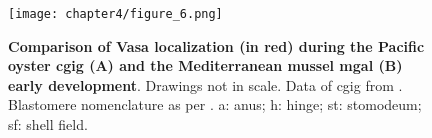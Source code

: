\begin{figure}
    \centering
    \captionsetup[subfigure]{labelformat=nocaption}
	\begin{subfigure}{0\linewidth}
	\caption{}\label{fig:vasaComparison-A}
	\end{subfigure}%
	\begin{subfigure}{0\linewidth}
    \caption{}\label{fig:vasaComparison-B}
    \end{subfigure}%
	\texttt{[image: chapter4/figure\_6.png]}
	\caption[\textbf{Comparison of Vasa localization (in red) during the Pacific oyster \gls{cgig} (A) and the Mediterranean mussel \gls{mgal} (B) early development}]
	{
		\textbf{Comparison of Vasa localization (in red) during the Pacific oyster \gls{cgig} (A) and the Mediterranean mussel \gls{mgal} (B) early development}. Drawings not in scale. Data of \gls{cgig} from . Blastomere nomenclature as per . a: anus; h: hinge; st: stomodeum; sf: shell field.
	}
	\label{fig:vasaComparison}
\end{figure}
\endgroup

